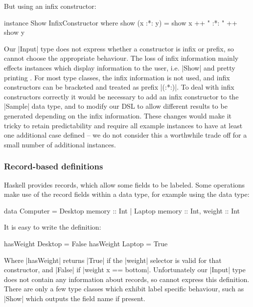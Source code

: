 \documentclass[preprint,draft]{sigplanconf}
\begin{document}
\noindent But using an infix constructor:

\begin{code}
instance Show InfixConstructor where
    show (x :*: y) = show x ++ " :*: " ++ show y
\end{code}

Our |Input| type does not express whether a constructor is infix or prefix, so cannot choose the appropriate behaviour. The loss of infix information mainly effects instances which display information to the user, i.e. |Show| and pretty printing \cite{hughespj:pretty_print}. For most type classes, the infix information is not used, and infix constructors can be bracketed and treated as prefix |(:*:)|. To deal with infix constructors correctly it would be necessary to add an infix constructor to the |Sample| data type, and to modify our DSL to allow different results to be generated depending on the infix information. These changes would make it tricky to retain predictability and require all example instances to have at least one additional case defined -- we do not consider this a worthwhile trade off for a small number of additional instances.

\subsubsection{Record-based definitions}

Haskell provides records, which allow some fields to be labeled. Some operations make use of the record fields within a data type, for example using the data type:

\begin{code}
data Computer  =  Desktop  {memory :: Int}
               |  Laptop   {memory :: Int, weight :: Int}
\end{code}

\noindent It is easy to write the definition:

\begin{code}
hasWeight Desktop{}  = False
hasWeight Laptop{}   = True
\end{code}

Where |hasWeight| returns |True| if the |weight| selector is valid for that constructor, and |False| if |weight x == bottom|. Unfortunately our |Input| type does not contain any information about records, so cannot express this definition. There are only a few type classes which exhibit label specific behaviour, such as |Show| which outputs the field name if present.
\end{document}
